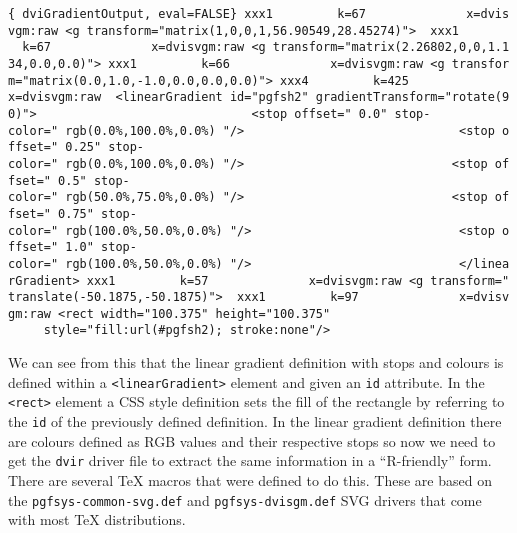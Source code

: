 \documentclass[]{article}
\begin{document}
\texttt{\{\ dviGradientOutput,\ eval=FALSE\}\ xxx1\ \ \ \ \ \ \ \ \ k=67\ \ \ \ \ \ \ \ \ \ \ \ \ \ x=dvisvgm:raw\ \textless{}g\ transform="matrix(1,0,0,1,56.90549,28.45274)"\textgreater{}\ \ xxx1\ \ \ \ \ \ \ \ \ k=67\ \ \ \ \ \ \ \ \ \ \ \ \ \ x=dvisvgm:raw\ \textless{}g\ transform="matrix(2.26802,0,0,1.134,0.0,0.0)"\textgreater{}\ xxx1\ \ \ \ \ \ \ \ \ k=66\ \ \ \ \ \ \ \ \ \ \ \ \ \ x=dvisvgm:raw\ \textless{}g\ transform="matrix(0.0,1.0,-1.0,0.0,0.0,0.0)"\textgreater{}\ xxx4\ \ \ \ \ \ \ \ \ k=425\ \ \ \ \ \ \ \ \ \ \ \ \ \ x=dvisvgm:raw\ \ \textless{}linearGradient\ id="pgfsh2"\ gradientTransform="rotate(90)"\textgreater{}\ \ \ \ \ \ \ \ \ \ \ \ \ \ \ \ \ \ \ \ \ \ \ \ \ \ \ \ \ \ \textless{}stop\ offset="\ 0.0"\ stop-color="\ rgb(0.0\%,100.0\%,0.0\%)\ "/\textgreater{}\ \ \ \ \ \ \ \ \ \ \ \ \ \ \ \ \ \ \ \ \ \ \ \ \ \ \ \ \ \ \textless{}stop\ offset="\ 0.25"\ stop-color="\ rgb(0.0\%,100.0\%,0.0\%)\ "/\textgreater{}\ \ \ \ \ \ \ \ \ \ \ \ \ \ \ \ \ \ \ \ \ \ \ \ \ \ \ \ \ \textless{}stop\ offset="\ 0.5"\ stop-color="\ rgb(50.0\%,75.0\%,0.0\%)\ "/\textgreater{}\ \ \ \ \ \ \ \ \ \ \ \ \ \ \ \ \ \ \ \ \ \ \ \ \ \ \ \ \ \textless{}stop\ offset="\ 0.75"\ stop-color="\ rgb(100.0\%,50.0\%,0.0\%)\ "/\textgreater{}\ \ \ \ \ \ \ \ \ \ \ \ \ \ \ \ \ \ \ \ \ \ \ \ \ \ \ \ \ \textless{}stop\ offset="\ 1.0"\ stop-color="\ rgb(100.0\%,50.0\%,0.0\%)\ "/\textgreater{}\ \ \ \ \ \ \ \ \ \ \ \ \ \ \ \ \ \ \ \ \ \ \ \ \ \ \ \ \ \textless{}/linearGradient\textgreater{}\ xxx1\ \ \ \ \ \ \ \ \ k=57\ \ \ \ \ \ \ \ \ \ \ \ \ \ x=dvisvgm:raw\ \textless{}g\ transform="translate(-50.1875,-50.1875)"\textgreater{}\ \ xxx1\ \ \ \ \ \ \ \ \ k=97\ \ \ \ \ \ \ \ \ \ \ \ \ \ x=dvisvgm:raw\ \textless{}rect\ width="100.375"\ height="100.375"\ \ \ \ \ \ \ \ \ \ \ \ \ \ \ \ \ \ \ \ \ \ \ \ \ \ \ \ \ \ style="fill:url(\#pgfsh2);\ stroke:none"/\textgreater{}}

We can see from this that the linear gradient definition with stops and
colours is defined within a
\texttt{\textless{}linearGradient\textgreater{}} element and given an
\texttt{id} attribute. In the \texttt{\textless{}rect\textgreater{}}
element a CSS style definition sets the fill of the rectangle by
referring to the \texttt{id} of the previously defined definition. In
the linear gradient definition there are colours defined as RGB values
and their respective stops so now we need to get the \texttt{dvir}
driver file to extract the same information in a ``R-friendly'' form.
There are several \TeX{} macros that were defined to do this. These are
based on the \texttt{pgfsys-common-svg.def} and
\texttt{pgfsys-dvisgm.def} SVG drivers that come with most \TeX{}
distributions.
\end{document}
